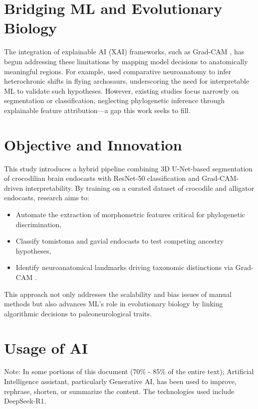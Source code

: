 \section{Bridging ML and Evolutionary Biology}  
The integration of explainable AI (XAI) frameworks, such as Grad-CAM \cite{Selvaraju_2017}, has begun addressing these limitations by mapping model decisions to anatomically meaningful regions. For example, \cite{Beyrand_2019} used comparative neuroanatomy to infer heterochronic shifts in flying archosaurs, underscoring the need for interpretable ML to validate such hypotheses. However, existing studies focus narrowly on segmentation or classification, neglecting phylogenetic inference through explainable feature attribution—a gap this work seeks to fill.  

\section{Objective and Innovation}  
This study introduces a hybrid pipeline combining 3D U-Net-based segmentation of crocodilian brain endocasts with ResNet-50 classification and Grad-CAM-driven interpretability. By training on a curated dataset of crocodile and alligator endocasts, research aims to:  
\begin{itemize}  
    \item Automate the extraction of morphometric features critical for phylogenetic discrimination,  
    \item Classify tomistoma and gavial endocasts to test competing ancestry hypotheses,  
    \item Identify neuroanatomical landmarks  driving taxonomic distinctions via Grad-CAM \cite{Selvaraju_2017}.  
\end{itemize}  
This approach not only addresses the scalability and bias issues of manual methods but also advances ML’s role in evolutionary biology by linking algorithmic decisions to paleoneurological traits.  

\section{Usage of AI}
Note: In some portions of this document (70\% - 85\% of the entire text); Artificial Intelligence assistant, particularly Generative AI, has been used to improve, rephrase, shorten, or summarize the content. The technologies used include DeepSeek-R1.


